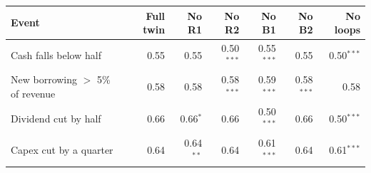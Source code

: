 \begin{tabular}{lrrrrrr}
\toprule
Event & Full twin & No R1 & No R2 & No B1 & No B2 & No loops \\
\midrule
Cash falls below half & 0.55 & 0.55 & 0.50$^{***}$ & 0.55$^{***}$ & 0.55 & 0.50$^{***}$ \\
New borrowing $>$ 5\% of revenue & 0.58 & 0.58 & 0.58$^{***}$ & 0.59$^{***}$ & 0.58$^{***}$ & 0.58 \\
Dividend cut by half & 0.66 & 0.66$^{*}$ & 0.66 & 0.50$^{***}$ & 0.66 & 0.50$^{***}$ \\
Capex cut by a quarter & 0.64 & 0.64$^{**}$ & 0.64 & 0.61$^{***}$ & 0.64 & 0.61$^{***}$ \\
\bottomrule
\end{tabular}
